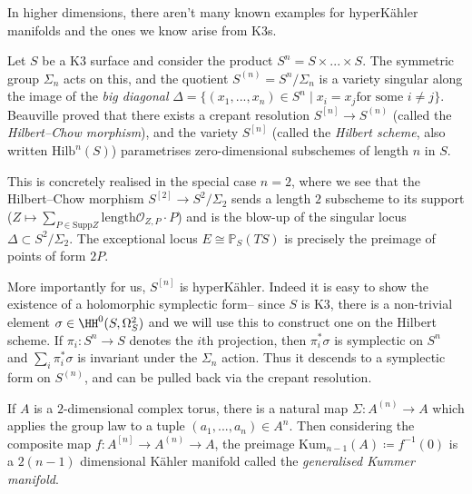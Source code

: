 In higher dimensions, there aren't many known examples for hyperK\"ahler
manifolds and the ones we know arise from K3s.

\begin{example}
    Let \(S\) be a K3 surface and consider the product \(S^n=S\times...\times
    S\). The symmetric group \(\Sigma_n\) acts on this, and the quotient
    \(S^{(n)}=S^n/\Sigma_n\) is a variety singular along the image of the
    \textit{big diagonal} \(\Delta=\{(x_1,...,x_n)\in S^n\;|\; x_i=x_j \text{
    for some }i\neq j\}\). Beauville proved that there exists a crepant
    resolution \(S^{[n]}\to S^{(n)}\) (called the \textit{Hilbert--Chow
    morphism}), and the variety \(S^{[n]}\) (called the \textit{Hilbert scheme},
    also written \(\text{Hilb}^n(S)\)) parametrises zero-dimensional subschemes
    of length \(n\) in \(S\).

    This is concretely realised in the special case \(n=2\), where we see that
    the Hilbert--Chow morphism \(S^{[2]}\to S^2/\Sigma_2\) sends a length \(2\)
    subscheme to its support (\(Z\mapsto \sum_{P\in
    \text{Supp}Z}\text{length}\mathscr{O}_{Z,P}\cdot P\)) and is the blow-up of the
    singular locus \(\Delta\subset S^2/\Sigma_2\). The exceptional locus
    \(E\cong \mathbb{P}_S(TS)\) is precisely the preimage of points of form
    \(2P\).

    More importantly for us, \(S^{[n]}\) is hyperK\"ahler.
    Indeed it is easy to show the existence of a holomorphic symplectic form--
    since \(S\) is K3, there is a non-trivial element \(\sigma\in
    \HH^0(S,\Omega^2_S)\) and we will use this to construct one on the Hilbert
    scheme. If \(\pi_i:S^n\to S\) denotes the \(i\)th
    projection, then \(\pi_i^\ast \sigma\) is symplectic on \(S^n\) and
    \(\sum_i \pi_i^\ast \sigma\) is invariant under the \(\Sigma_n\)
    action. Thus it descends to a symplectic form on \(S^{(n)}\), and can
    be pulled back via the crepant resolution.
\end{example}

\begin{example}
    If \(A\) is a \(2\)-dimensional complex torus, there is a natural map
    \(\Sigma:A^{(n)}\to A\) which applies the group law to a tuple
    \((a_1,...,a_n)\in A^n\). Then considering the composite map
    \(f:A^{[n]}\to A^{(n)}\to A\), the preimage \(\text{Kum}_{n-1}(A)\coloneq
    f^{-1}(0)\) is a \(2(n-1)\) dimensional K\"ahler manifold called the
    \textit{generalised Kummer manifold}.
\end{example}

